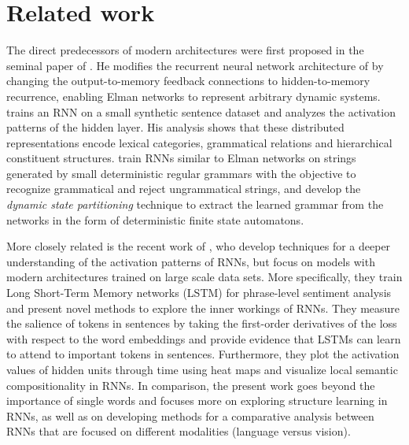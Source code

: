 \section{Related work}
\label{sec:related}

The direct predecessors of modern architectures were first proposed in the 
seminal paper of . He modifies the recurrent 
neural network architecture of  by changing the output-to-memory 
feedback connections to hidden-to-memory recurrence, enabling Elman networks to 
represent arbitrary dynamic systems.  trains an RNN on a small synthetic
sentence  dataset and analyzes the activation patterns of the hidden
layer. His analysis shows that these distributed representations  
encode lexical categories, grammatical relations and hierarchical constituent 
structures.  train RNNs similar to Elman
networks on strings generated by small 
deterministic regular grammars with the objective to recognize grammatical and reject ungrammatical 
strings, and develop the \emph{dynamic state partitioning} technique to extract the learned 
grammar from the networks in the form of deterministic finite state
automatons.

More closely related is the recent work of , who develop techniques 
for a deeper understanding of the activation patterns of RNNs, but focus on models with 
modern architectures trained on large scale data sets. More specifically, they train Long 
Short-Term Memory networks (LSTM) \cite{hochreiter1997long} 
for phrase-level sentiment analysis 
and present novel methods 
to explore the inner workings of RNNs. They measure the salience of tokens
in sentences by taking the first-order derivatives of the loss with respect to the
word embeddings and provide evidence 
that LSTMs can learn to attend to important tokens in sentences. Furthermore,
they plot the activation values of hidden units through time using heat maps 
and visualize local semantic compositionality in RNNs. 
In comparison, the present work goes beyond the importance of single words and focuses more on exploring structure 
learning in RNNs, as well as on developing methods for a comparative analysis between RNNs that are focused on different modalities (language versus vision).

